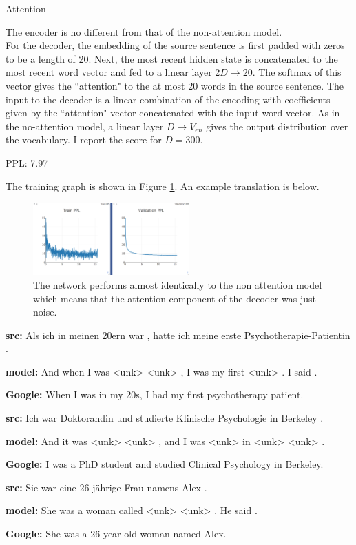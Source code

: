\documentclass[11pt]{article}
\begin{document}
\begin{subsection}{Attention}

The encoder is no different from that of the non-attention model.\\
For the decoder, the embedding of the source sentence is first padded with zeros to be a length of 20. Next, the most recent hidden state is concatenated to the most recent word vector and fed to a linear layer $2D \rightarrow 20$. The softmax of this vector gives the ``attention" to the at most 20 words in the source sentence. The input to the decoder is a linear combination of the encoding with coefficients given by the ``attention" vector concatenated with the input word vector. As in the no-attention model, a linear layer $D \rightarrow V_{en}$ gives the output distribution over the vocabulary. I report the score for $D=300$.\\
\centerline{PPL: 7.97}
The training graph is shown in Figure \ref{fig:att}. An example translation is below.

 \begin{figure}
  \centering
  \includegraphics[width=6cm]{imgs/att}
  \caption{\label{fig:att} The network performs almost identically to the non attention model which means that the attention component of the decoder was just noise.}
\end{figure}

\centerline{{\bf src:} Als ich in meinen 20ern war , hatte ich meine erste Psychotherapie-Patientin .}
\centerline{{\bf model:} And when I was <unk> <unk> , I was my first <unk> . I said .}
\centerline{{\bf Google:} When I was in my 20s, I had my first psychotherapy patient.}
\centerline{}
\centerline{{\bf src:} Ich war Doktorandin und studierte Klinische Psychologie in Berkeley .}
\centerline{{\bf model:} And it was <unk> <unk> , and I was <unk> in <unk> <unk> .}
\centerline{{\bf Google:} I was a PhD student and studied Clinical Psychology in Berkeley.}
\centerline{}
\centerline{{\bf src:} Sie war eine 26-jährige Frau namens Alex .}
\centerline{{\bf model:} She was a woman called <unk> <unk> . He said .}
\centerline{{\bf Google:} She was a 26-year-old woman named Alex.}

\end{subsection}
\end{document}
